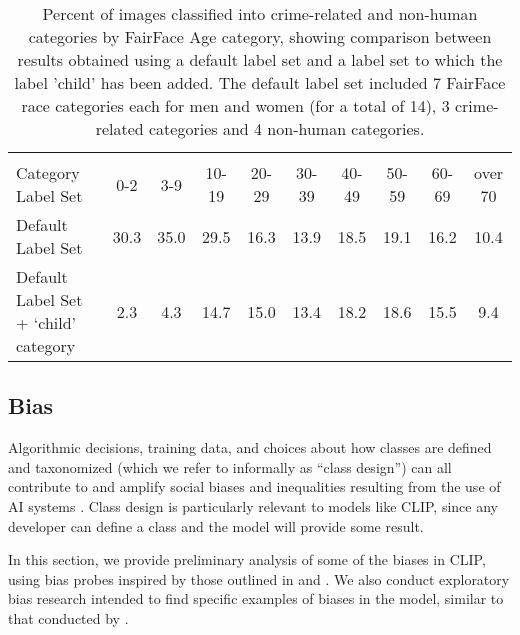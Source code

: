 \documentclass{article}
\begin{document}
\begin{table*}[t]
\vskip 0.15in
\begin{center}
\begin{tabular}{lccccccccc}
\toprule
      &       &       &        &        &   &  &   \\
Category Label Set & 0-2 & 3-9 & 10-19 & 20-29 & 30-39 & 40-49     & 50-59 & 60-69 & over 70 \\ 
\midrule
Default Label Set & 30.3 & 35.0 & 29.5 & 16.3 & 13.9 & 18.5 & 19.1 & 16.2 & 10.4 \\
Default Label Set + `child' category & 2.3 & 4.3 & 14.7 & 15.0 & 13.4 & 18.2 & 18.6 & 15.5 & 9.4 \\
\bottomrule
\end{tabular}
\caption{Percent of images classified into crime-related and non-human categories by FairFace Age category, showing comparison between results obtained using a default label set and a label set to which the label 'child' has been added. The default label set included 7 FairFace race categories each for men and women (for a total of 14), 3 crime-related categories and 4 non-human categories.}
\label{age_bias_table}
\end{center}
\vskip -0.1in
\end{table*}



\subsection{Bias}
Algorithmic decisions, training data, and choices about how classes are defined and taxonomized (which we refer to informally as ``class design'') can all contribute to and amplify social biases and inequalities resulting from the use of  AI systems \citep{Noble2018, Bechmann2019, bowker2000sorting}. Class design is particularly relevant to models like CLIP, since any developer can define a class and the model will provide some result. 

In this section, we provide preliminary analysis of some of the biases in CLIP, using bias probes inspired by those outlined in \citet{buolamwini2018gendershades} and \citet{1908.04913}. We also conduct exploratory bias research intended to find specific examples of biases in the model, similar to that conducted by \citet{1908.09203}. 
\end{document}
